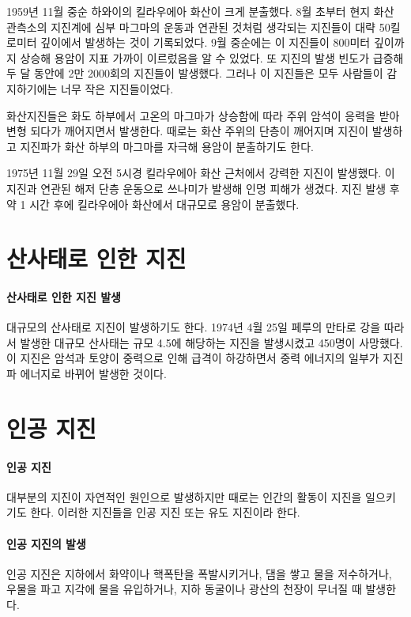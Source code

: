 \documentclass[12pt, a4paper, oneside]{book}
\begin{document}
		
		1959년 11월 중순 하와이의 킬라우에아 화산이 크게 분출했다.
		8월 초부터 현지 화산 관측소의 지진계에 심부 마그마의 운동과 연관된 것처럼 생각되는 지진들이 
		대략 50킬로미터 깊이에서 발생하는 것이 기록되었다.
		9월 중순에는 이 지진들이 800미터 깊이까지 상승해 용암이 지표 가까이 이르렀음을 알 수 있었다.
		또 지진의 발생 빈도가 급증해 두 달 동안에 2만 2000회의 지진들이 발생했다.
		그러나 이 지진들은 모두 사람들이 감지하기에는 너무 작은 지진들이었다. 
		
		화산지진들은 화도 하부에서 고온의 마그마가 상승함에 따라 주위 암석이 응력을 받아 변형 되다가 깨어지면서 발생한다.
		때로는 화산 주위의 단층이 깨어지며 지진이 발생하고 지진파가 화산 하부의 마그마를 자극해 용암이 분출하기도 한다. 
		
		1975년 11월 29일 오전 5시경 킬라우에아 화산 근처에서 강력한 지진이 발생했다. 
		이 지진과 연관된 해저 단층 운동으로 쓰나미가 발생해 인명 피해가 생겼다. 
		지진 발생 후 약 1 시간 후에 킬라우에아 화산에서 대규모로 용암이 분출했다.
		

	\clearpage
	\section{산사태로 인한 지진}

		\paragraph{산사태로 인한 지진 발생}
		대규모의 산사태로 지진이 발생하기도 한다.
		1974년 4월 25일 페루의 만타로 강을 따라서 발생한 대규모 산사태는 규모 4.5에 해당하는 지진을 발생시켰고 450명이 사망했다.
		이 지진은 암석과 토양이 중력으로 인해 급격이 하강하면서 중력 에너지의 일부가 지진파 에너지로 바뀌어 발생한 것이다.
		
	\clearpage
	\section{인공 지진}
		
		\paragraph{인공 지진}
		대부분의 지진이 자연적인 원인으로 발생하지만 때로는 인간의 활동이 지진을 일으키기도 한다.
		이러한 지진들을 인공 지진 또는 유도 지진이라 한다.

		\paragraph{인공 지진의 발생}
		인공 지진은 지하에서 화약이나 핵폭탄을 폭발시키거나, 
		댐을 쌓고 물을 저수하거나, 우물을 파고 지각에 물을 유입하거나, 
		지하 동굴이나 광산의 천장이 무너질 때 발생한다.
\end{document}
